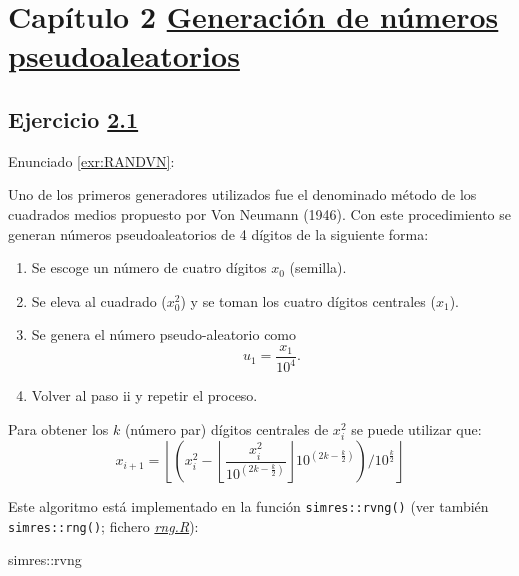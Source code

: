 \documentclass[
]{book}
\newenvironment{Shaded}{\begin{snugshade}}{\end{snugshade}}
\newcommand{\NormalTok}[1]{#1}
\newcommand{\SpecialCharTok}[1]{\textcolor[rgb]{0.00,0.00,0.00}{#1}}
\theoremstyle{break}
\theoremstyle{nonumberplain}
\begin{document}
\hypertarget{capuxedtulo-2-generaciuxf3n-de-nuxfameros-pseudoaleatorios}{%
\section{\texorpdfstring{Capítulo 2 \href{gen-pseudo.html}{Generación de números pseudoaleatorios}}{Capítulo 2 Generación de números pseudoaleatorios}}\label{capuxedtulo-2-generaciuxf3n-de-nuxfameros-pseudoaleatorios}}

\hypertarget{sol-RANDVN}{%
\subsection{\texorpdfstring{Ejercicio \href{ejercicios.html\#exr:RANDVN}{2.1}}{Ejercicio 2.1}}\label{sol-RANDVN}}

Enunciado \ref{exr:RANDVN}:

Uno de los primeros generadores utilizados fue el denominado método de los
cuadrados medios propuesto por Von Neumann (1946). Con este
procedimiento se generan números pseudoaleatorios de 4 dígitos de la
siguiente forma:

\begin{enumerate}
\def\labelenumi{\roman{enumi}.}
\item
  Se escoge un número de cuatro dígitos \(x_0\) (semilla).
\item
  Se eleva al cuadrado (\(x_0^2\)) y se toman los cuatro dígitos centrales (\(x_1\)).
\item
  Se genera el número pseudo-aleatorio como \[u_1=\frac{x_1}{10^{4}}.\]
\item
  Volver al paso ii y repetir el proceso.
\end{enumerate}

Para obtener los \(k\) (número par) dígitos centrales de \(x_{i}^2\)
se puede utilizar que:
\[x_{i+1}=\left\lfloor \left(  x_{i}^2-\left\lfloor \dfrac{x_{i}^2}{10^{(2k-\frac{k}2)}}\right\rfloor 10^{(2k-\frac{k}2)}\right)
/10^{\frac{k}2}\right\rfloor\]

Este algoritmo está implementado en la función \texttt{simres::rvng()} (ver también \texttt{simres::rng()}; fichero \href{R/rng.R}{\emph{rng.R}}):

\begin{Shaded}
\begin{Highlighting}[]
\NormalTok{simres}\SpecialCharTok{::}\NormalTok{rvng}
\end{Highlighting}
\end{Shaded}
\end{document}
